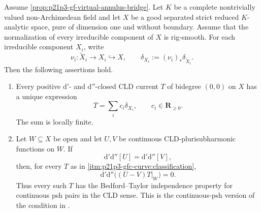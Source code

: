 \begin{proposition}
\label{prop:p21p3-gfc-curve-rigidity}
Assume \cref{prop:p21p3-gf-virtual-annulus-bridge}.  Let $K$ be a
complete nontrivially valued non-Archimedean field and let $X$ be a good
separated strict reduced $K$-analytic space, pure of dimension one and
without boundary.  Assume that the normalization of every irreducible
component of $X$ is rig-smooth.  For each irreducible component $X_i$,
write
\[
        \nu_i:\widetilde X_i\longrightarrow X_i\hookrightarrow X,
        \qquad
        \delta_{X_i}:=(\nu_i)_*\delta_{\widetilde X_i}.
\]
Then the following assertions hold.

\begin{enumerate}
\item\label{itm:p21p3-gfc-curve:classification}
Every positive $\mathrm d'$- and $\mathrm d''$-closed CLD current $T$
of bidegree $(0,0)$ on $X$ has a unique expression
\begin{equation}
\label{eq:p21p3-gfc-curve-classification}
                         T=\sum_i c_i\delta_{X_i},
                         \qquad c_i\in\mathbf R_{\geq0}.
\end{equation}
The sum is locally finite.

\item\label{itm:p21p3-gfc-curve:bedford-taylor}
Let $W\subseteq X$ be open and let $U,V$ be continuous
CLD-plurisubharmonic functions on $W$.  If
\begin{equation}
\label{eq:p21p3-gfc-curve-equal-curvature}
           \mathrm d'\mathrm d''[U]
           =\mathrm d'\mathrm d''[V],
\end{equation}
then, for every $T$ as in
\cref{itm:p21p3-gfc-curve:classification},
\begin{equation}
\label{eq:p21p3-gfc-curve-bt-conclusion}
             \mathrm d'\mathrm d''\bigl((U-V)T|_W\bigr)=0.
\end{equation}
Thus every such $T$ has the Bedford--Taylor independence property for
continuous psh pairs in the CLD sense.  This is the continuous-psh version
of the condition in \cite[Definition~8.6.2]{CLD25}.
\end{enumerate}
\end{proposition}

